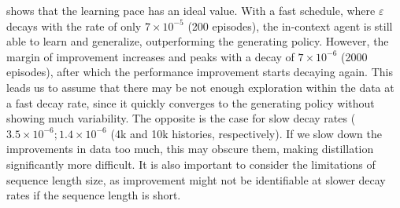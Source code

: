 \documentclass{article}
\theoremstyle{plain}
\theoremstyle{definition}
\theoremstyle{remark}
\begin{document}
 shows that the learning pace has an ideal value. With a fast schedule, where $\varepsilon$ decays with the rate of only $7 \times 10^{-5}$ (200 episodes), the in-context agent is still able to learn and generalize, outperforming the generating policy. However, the margin of improvement increases and peaks with a decay of $7 \times 10^{-6}$ (2000 episodes), after which the performance improvement starts decaying again. This leads us to assume that there may be not enough exploration within the data at a fast decay rate, since it quickly converges to the generating policy without showing much variability. The opposite is the case for slow decay rates ($3.5 \times 10^{-6}; 1.4 \times 10^{-6}$ (4k and 10k histories, respectively). If we slow down the improvements in data too much, this may obscure them, making distillation significantly more difficult. It is also important to consider the limitations of sequence length size, as improvement might not be identifiable at slower decay rates if the sequence length is short.





\end{document}
